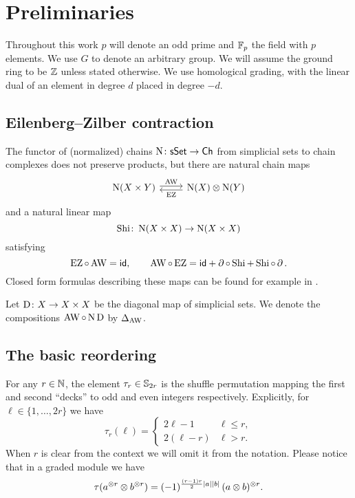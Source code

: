 
\section{Preliminaries}\label{s:preliminaries}

Throughout this work $p$ will denote an odd prime and ${\mathbb{F}_p}$ the field with $p$ elements.
We use $G$ to denote an arbitrary group.
We will assume the ground ring to be $\mathbb{Z}$ unless stated otherwise.
We use homological grading, with the linear dual of an element in degree $d$ placed in degree $-d$.

\subsection{Eilenberg--Zilber contraction}

The functor of (normalized) chains $\operatorname{N} \colon \mathsf{sSet} \to \mathsf{Ch}$ from simplicial sets to chain complexes does not preserve products, but there are natural chain maps
\[
\begin{tikzcd}
	\chains(X \times Y) \arrow[r,shift left=2pt,"\AW"] &
	\chains(X) \ot \chains(Y) \arrow[l,shift left=2pt,"\EZ"]
\end{tikzcd}
\]
and a natural linear map
\[
\operatorname{Shi} \colon \operatorname{N}(X \times X) \to \operatorname{N}(X \times X)
\]
satisfying
\[
\operatorname{EZ} \circ \operatorname{AW} = \mathsf{id}, \qquad
\operatorname{AW} \circ \operatorname{EZ} = \mathsf{id} + \operatorname{\partial} \circ \operatorname{Shi} + \operatorname{Shi} \circ \operatorname{\partial}.
\]
Closed form formulas describing these maps can be found for example in \cite[56]{real2000homological}.

Let $\mathrm{D} \colon X \to X \times X$ be the diagonal map of simplicial sets.
We denote the compositions $\operatorname{AW} \circ \operatorname{N}\mathrm{D}$ by $\Delta_{\operatorname{AW}}$.

\subsection{The basic reordering}\label{ss:reordering}

For any $r \in \mathbb{N}$, the element $\tau_r \in \mathbb{S}_{2r}$ is the shuffle permutation mapping the first and second ``decks'' to odd and even integers respectively.
Explicitly, for $\ell \in \{1,\dots,2r\}$ we have
\begin{equation*}
	\tau_r(\ell) =
	\begin{cases}
		2\ell-1 & \ell \leq r, \\
		2(\ell-r) & \ell > r.
	\end{cases}
\end{equation*}
When $r$ is clear from the context we will omit it from the notation.
Please notice that in a graded module we have
\[
\tau(a^{\otimes r} \otimes b^{\otimes r}) =
(-1)^{\frac{(r-1)r}{2}\lvert a\rvert\lvert b\rvert} \, (a \otimes b)^{\otimes r}.
\]